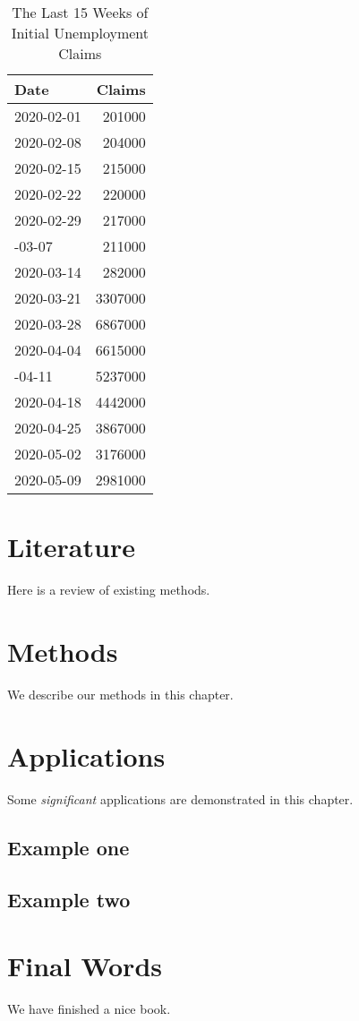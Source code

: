 \documentclass[
]{book}
\begin{document}
\begin{table}

\caption{\label{tab:initial}The Last 15 Weeks of Initial Unemployment Claims}
\centering
\begin{tabular}[t]{lr}
\toprule
Date & Claims\\
\midrule
2020-02-01 & 201000\\
2020-02-08 & 204000\\
2020-02-15 & 215000\\
2020-02-22 & 220000\\
2020-02-29 & 217000\\
\addlinespace
2020-03-07 & 211000\\
2020-03-14 & 282000\\
2020-03-21 & 3307000\\
2020-03-28 & 6867000\\
2020-04-04 & 6615000\\
\addlinespace
2020-04-11 & 5237000\\
2020-04-18 & 4442000\\
2020-04-25 & 3867000\\
2020-05-02 & 3176000\\
2020-05-09 & 2981000\\
\bottomrule
\end{tabular}
\end{table}

\hypertarget{literature}{%
\chapter{Literature}\label{literature}}

Here is a review of existing methods.

\hypertarget{methods}{%
\chapter{Methods}\label{methods}}

We describe our methods in this chapter.

\hypertarget{applications}{%
\chapter{Applications}\label{applications}}

Some \emph{significant} applications are demonstrated in this chapter.

\hypertarget{example-one}{%
\section{Example one}\label{example-one}}

\hypertarget{example-two}{%
\section{Example two}\label{example-two}}

\hypertarget{final-words}{%
\chapter{Final Words}\label{final-words}}

We have finished a nice book.

  
\end{document}
